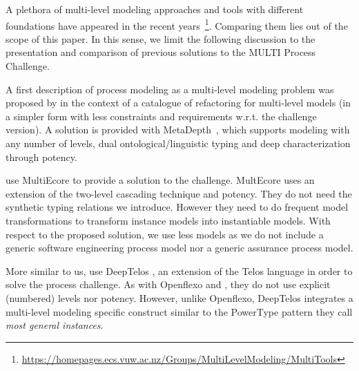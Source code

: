 
A plethora of multi-level modeling approaches and tools with different foundations have appeared in the recent years~\footnote{\url{https://homepages.ecs.vuw.ac.nz/Groups/MultiLevelModeling/MultiTools}}. Comparing them lies out of the scope of this paper. In this sense, we limit the following discussion to the presentation and comparison of previous solutions to the MULTI Process Challenge.

A first description of process modeling as a multi-level modeling problem was proposed by \cite{lara2018refactoring} in the context of a catalogue of refactoring for multi-level models (in a simpler form with less constraints and requirements w.r.t. the challenge version). A solution is provided with MetaDepth~\citep{metadepth}, which supports modeling with any number of levels, dual ontological/linguistic typing and deep characterization through potency.

\cite{multiecore2019} use MultiEcore \citep{multecore2016} to provide a solution to the challenge. MultEcore uses an extension of the two-level cascading technique and potency. They do not need the synthetic typing relations we introduce. However they need to do frequent model transformations to transform instance models into instantiable models. With respect to the proposed solution, we use less models as we do not include a generic software engineering process model nor a generic assurance process model. %

More similar to us, \cite{deeptelos2019} use DeepTelos \citep{deeptelos2016}, an extension of the Telos language \citep{telos1990} in order to solve the process challenge. As with Openflexo and \FML, they do not use explicit (numbered) levels nor potency. However, unlike Openflexo, DeepTelos integrates a multi-level modeling specific construct similar to the PowerType \citep{atkinson2001essence} pattern they call \emph{most general instances}.


